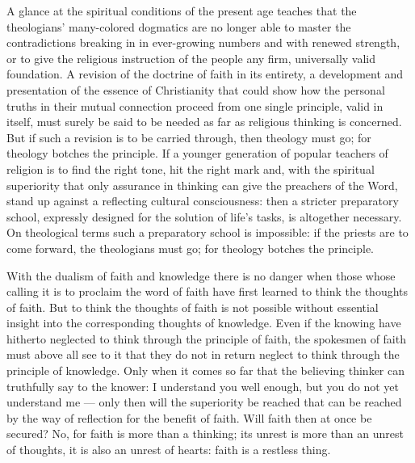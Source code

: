 \documentclass[12pt]{book}
\newcommand{\opage}[1]{\marginnote{\footnotesize\textit{[#1]}}}
\begin{document}
A glance at the spiritual conditions of the present age teaches that the
theologians' many-colored dogmatics are no longer able to master the
contradictions breaking in in ever-growing numbers and with renewed strength,
or to give the religious instruction of the people any firm, universally valid
foundation. A revision of the doctrine of faith in its entirety, a development
and presentation of the essence of Christianity that could show how the
personal truths in their mutual connection proceed from one single principle,
valid in itself, must surely be said to be needed as far as religious thinking
is concerned. But if such a revision is to be carried through, then theology
must go; for theology botches the principle. If a younger generation of
popular teachers of religion is to find the right tone, hit the right mark and,
with the spiritual superiority that only assurance in thinking can give the
preachers of the Word, stand up against
\opage{276}\setcounter{footnote}{0}%
a reflecting cultural consciousness: then a stricter preparatory school,
expressly designed for the solution of life's tasks, is altogether necessary.
On theological terms such a preparatory school is impossible: if the priests
are to come forward, the theologians must go; for theology botches the
principle.

With the dualism of faith and knowledge there is no danger when those whose
calling it is to proclaim the word of faith have first learned to think the
thoughts of faith. But to think the thoughts of faith is not possible without
essential insight into the corresponding thoughts of knowledge. Even if the
knowing have hitherto neglected to think through the principle of faith, the
spokesmen of faith must above all see to it that they do not in return
neglect to think through the principle of knowledge. Only when it comes so
far that the believing thinker can truthfully say to the knower: I understand
you well enough, but you do not yet understand me --- only then will the
superiority be reached that can be reached by the way of reflection for the
benefit of faith. Will faith then at once be secured? No, for faith is more
than a thinking; its unrest is more than an unrest of thoughts, it is also an
unrest of hearts: faith is a restless thing.
\end{document}
